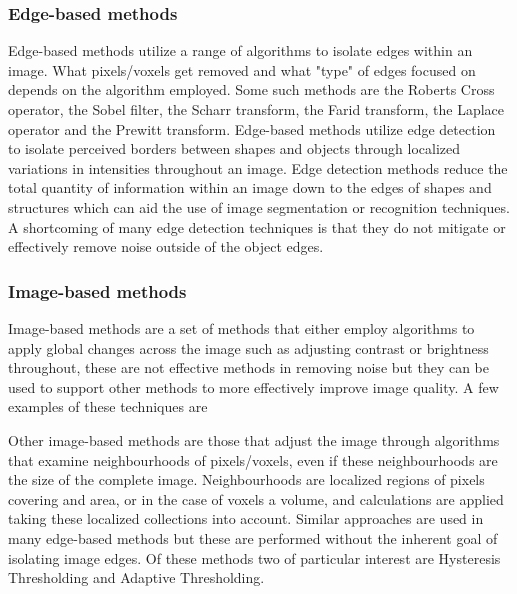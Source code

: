 \subsubsection{Edge-based methods}
Edge-based methods utilize a range of algorithms to isolate edges within an image. What pixels/voxels get removed and what "type" of edges focused on depends on the algorithm employed. Some such methods are the Roberts Cross operator, the Sobel filter, the Scharr transform, the Farid transform, the Laplace operator and the Prewitt transform. Edge-based methods utilize edge detection to isolate perceived borders between shapes and objects through localized variations in intensities throughout an image. Edge detection methods reduce the total quantity of information within an image down to the edges of shapes and structures which can aid the use of image segmentation or recognition techniques. A shortcoming of many edge detection techniques is that they do not mitigate or effectively remove noise outside of the object edges.
\subsubsection{Image-based methods}
Image-based methods are a set of methods that either employ algorithms to apply global changes across the image such as adjusting contrast or brightness throughout, these are not effective methods in removing noise but they can be used to support other methods to more effectively improve image quality. A few examples of these techniques are  \par Other image-based methods are those that adjust the image through algorithms that examine neighbourhoods of pixels/voxels, even if these neighbourhoods are the size of the complete image. Neighbourhoods are localized regions of pixels covering and area, or in the case of voxels a volume, and calculations are applied taking these localized collections into account. Similar approaches are used in many edge-based methods but these are performed without the inherent goal of isolating image edges. Of these methods two of particular interest are Hysteresis Thresholding\cite{Hysteresis} and Adaptive Thresholding. 


